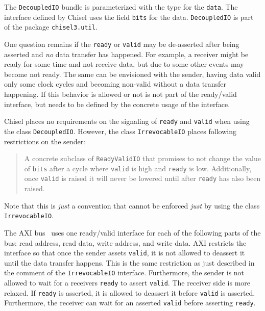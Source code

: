 \documentclass[%
    10pt,
    headinclude, footexclude,
    openright, %
    notitlepage,
    cleardoubleempty,
    headsepline,
    pointlessnumbers,
    bibtotoc, idxtotoc,
    ]{scrbook}
\newcommand{\code}[1]{{\lstinline[basicstyle=\small\ttfamily]{#1}}}
\begin{document}

\noindent The \code{DecoupledIO} bundle is parameterized with the type for
the \code{data}. The interface defined by Chisel uses the field \code{bits}
for the data. \code{DecoupledIO} is part of the package \code{chisel3.util}.

One question remains if the \code{ready} or \code{valid} may be de-asserted
after being asserted and \emph{no} data transfer has happened.
For example, a receiver might be ready for some time and not receive data, but
due to some other events may become not ready.
The same can be envisioned with the sender, having data valid only some
clock cycles and becoming non-valid without a data transfer happening.
If this behavior is allowed or not is not part of the ready/valid interface,
but needs to be defined by the concrete usage of the interface.

Chisel places no requirements on the signaling of \code{ready} and \code{valid}
when using the class \code{DecoupledIO}.
However, the class \code{IrrevocableIO} places following restrictions
on the sender:

\begin{quote}
A concrete subclass of \code{ReadyValidIO} that promises to not change
the value of \code{bits} after a cycle where \code{valid} is high and \code{ready} is low.
Additionally, once \code{valid} is raised it will never be lowered until after
\code{ready} has also been raised.
\end{quote}

\noindent Note that this is \emph{just} a convention that cannot be enforced \emph{just}
by using the class \code{IrrevocableIO}.

The AXI  bus~\cite{axi4standard} uses one ready/valid interface for each of the following parts of the bus:
read address, read data, write address, and write data. AXI restricts the interface
so that once the sender assets \code{valid}, it is not allowed to deassert it
until the data transfer happens. This is the same restriction as just described
in the comment of the \code{IrrevocableIO} interface.
Furthermore, the sender is not allowed to wait for a receivers
\code{ready} to assert \code{valid}.
The receiver side is more relaxed. If \code{ready} is asserted, it is allowed to deassert it
before \code{valid} is asserted. Furthermore, the receiver can wait for an asserted
\code{valid} before asserting \code{ready}.

\end{document}
